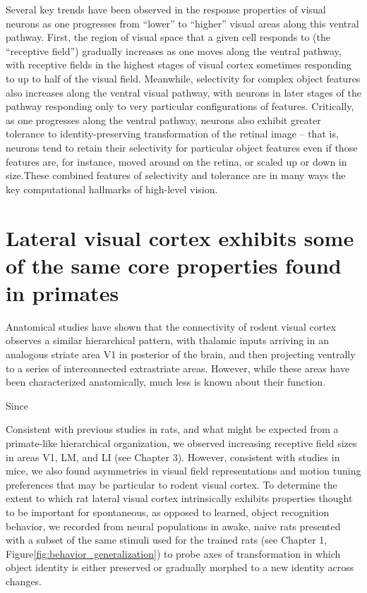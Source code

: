 Several key trends have been observed in the response properties of visual neurons as one progresses from ``lower'' to ``higher'' visual areas along this ventral pathway. First, the region of visual space that a given cell responds to (the ``receptive field'') gradually increases as one moves along the ventral pathway, with receptive fields in the highest stages of visual cortex sometimes responding to up to half of the visual field\cite{op2000spatial}. Meanwhile, selectivity for complex object features also increases along the ventral visual pathway, with neurons in later stages of the pathway responding only to very particular configurations of features\cite{Desimone1984, Logothetis1996}.  Critically, as one progresses along the ventral pathway, neurons also exhibit greater tolerance to identity-preserving transformation of the retinal image -- that is, neurons tend to retain their selectivity for particular object features even if those features are, for instance, moved around on the retina, or scaled up or down in size\cite{Ito1995}.These combined features of selectivity and tolerance are in many ways the key computational hallmarks of high-level vision\cite{DiCarlo2007, DiCarlo2012}. 

\section{Lateral visual cortex exhibits some of the same core properties found in primates}
Anatomical studies have shown that the connectivity of rodent visual cortex observes a similar hierarchical pattern, with thalamic inputs arriving in an analogous striate area V1 in posterior of the brain, and then projecting ventrally to a series of interconnected extrastriate areas\cite{Coogan1993, ETC}. However, while these areas have been characterized anatomically, much less is known about their function.

Since 

Consistent with previous studies in rats, and what might be expected from a primate-like hierarchical organization, we observed increasing receptive field sizes in areas V1, LM, and LI (see Chapter 3). However, consistent with studies in mice, we also found asymmetries in visual field representations and motion tuning preferences that may be particular to rodent visual cortex. To determine the extent to which rat lateral visual cortex intrinsically exhibits properties thought to be important for spontaneous, as opposed to learned, object recognition behavior, we recorded from neural populations in awake, naive rats presented with a subset of the same stimuli used for the trained rats (see Chapter 1, Figure\ref{fig:behavior_generalization}) to probe axes of transformation in which object identity is either preserved or gradually morphed to a new identity across changes.


